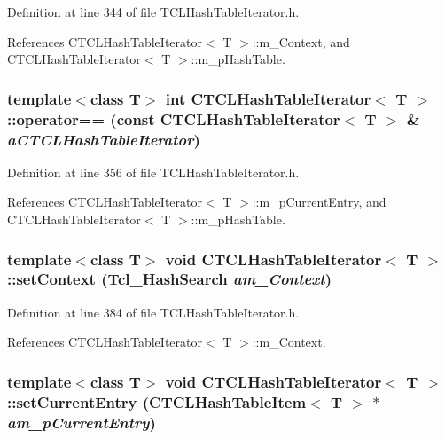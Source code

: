 Definition at line 344 of file TCLHash\-Table\-Iterator.h.

References CTCLHash\-Table\-Iterator$<$ T $>$::m\_\-Context, and CTCLHash\-Table\-Iterator$<$ T $>$::m\_\-p\-Hash\-Table.
\subsubsection{\setlength{\rightskip}{0pt plus 5cm}template$<$class T$>$ int CTCLHash\-Table\-Iterator$<$ T $>$::operator== (const CTCLHash\-Table\-Iterator$<$ T $>$ \& {\em a\-CTCLHash\-Table\-Iterator})\hspace{0.3cm}{\tt  [inline]}}\label{classCTCLHashTableIterator_a4}




Definition at line 356 of file TCLHash\-Table\-Iterator.h.

References CTCLHash\-Table\-Iterator$<$ T $>$::m\_\-p\-Current\-Entry, and CTCLHash\-Table\-Iterator$<$ T $>$::m\_\-p\-Hash\-Table.
\subsubsection{\setlength{\rightskip}{0pt plus 5cm}template$<$class T$>$ void CTCLHash\-Table\-Iterator$<$ T $>$::set\-Context (Tcl\_\-Hash\-Search {\em am\_\-Context})\hspace{0.3cm}{\tt  [inline]}}\label{classCTCLHashTableIterator_a8}




Definition at line 384 of file TCLHash\-Table\-Iterator.h.

References CTCLHash\-Table\-Iterator$<$ T $>$::m\_\-Context.
\subsubsection{\setlength{\rightskip}{0pt plus 5cm}template$<$class T$>$ void CTCLHash\-Table\-Iterator$<$ T $>$::set\-Current\-Entry ({\bf CTCLHash\-Table\-Item}$<$ T $>$ $\ast$ {\em am\_\-p\-Current\-Entry})\hspace{0.3cm}{\tt  [inline]}}\label{classCTCLHashTableIterator_a9}




